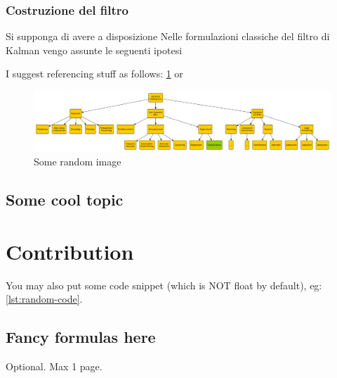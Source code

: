\documentclass[12pt,a4paper,openright,twoside]{book}
\begin{document}
\subsection{Costruzione del filtro}

Si supponga di avere a disposizione 
Nelle formulazioni classiche del filtro di Kalman vengo assunte le seguenti ipotesi

I suggest referencing stuff as follows: \cref{fig:random-image} or 

\begin{figure}
    \centering
    \includegraphics[width=.8\linewidth]{figures/random-image.pdf}
    \caption{Some random image}
    \label{fig:random-image}
\end{figure}

\section{Some cool topic}

\chapter{Contribution}

You may also put some code snippet (which is NOT float by default), eg: \cref{lst:random-code}.



\section{Fancy formulas here}


\backmatter





\begin{acknowledgements} %
Optional. Max 1 page.
\end{acknowledgements}
\end{document}
